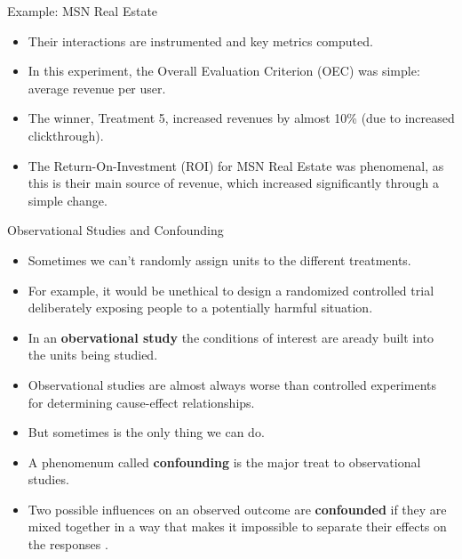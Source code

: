 \documentclass[handout]{beamer}
\begin{document}
\begin{frame}{Example: MSN Real Estate}
\scriptsize{


\begin{itemize}


 
 \item Their interactions are instrumented and key metrics computed. 
 
 \item In this experiment, the Overall Evaluation Criterion (OEC) was simple: average revenue per user.
 \item The winner, Treatment 5, increased revenues by almost 10\% (due to increased clickthrough).
 
 \item The Return-On-Investment (ROI) for MSN Real Estate was phenomenal, as this is their main source of revenue, which increased significantly through a simple change.

\end{itemize}



} 
\end{frame}




\begin{frame}{Observational Studies and Confounding}
\scriptsize{

\begin{itemize}

 \item Sometimes we can't randomly assign units to the different treatments.
 
 \item For example, it would be unethical to design a randomized controlled trial deliberately exposing people to a potentially harmful situation. 
 
 \item In an \textbf{obervational study} the conditions of interest are aready built into the units being studied.
 
 \item Observational studies are almost always worse than controlled experiments for determining cause-effect relationships.
 
 \item But sometimes is the only thing we can do.
 
 \item A phenomenum called \textbf{confounding} is the major treat to observational studies.
 
 \item Two possible influences on an observed outcome are \textbf{confounded} if they are mixed together in a way that makes it impossible to separate their effects on the responses \cite{watkins2010statistics}.
  
\end{itemize}



} 
\end{frame}
\end{document}
